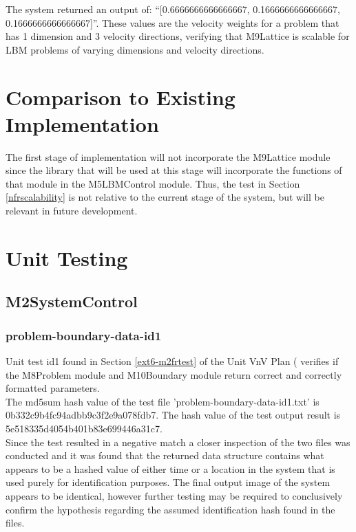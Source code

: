\documentclass[12pt, titlepage]{article}
\begin{document}
\noindent The system returned an output of: ``[0.6666666666666667, 0.1666666666666667, 0.1666666666666667]''. These values are the velocity weights for a problem that has 1 dimension and 3 velocity directions, verifying that M9Lattice is scalable for LBM problems of varying dimensions and velocity directions. 

\section{Comparison to Existing Implementation}	

The first stage of implementation will not incorporate the M9Lattice module since the library that will be used at this stage will incorporate the functions of that module in the M5LBMControl module. Thus, the test in Section \ref{nfrscalability} is not relative to the current stage of the system, but will be relevant in future development.

\section{Unit Testing}
\label{unittesting}

\subsection{M2SystemControl}
\subsubsection{problem-boundary-data-id1}
\label{M2id1}

Unit test id1 found in Section \ref{ext6-m2frtest} of the Unit VnV Plan (\citet{LBM_UVNV_PM} verifies if the M8Problem module and M10Boundary module return correct and correctly formatted parameters.\\

\noindent The md5sum hash value of the test file 'problem-boundary-data-id1.txt' is  0b332c9b4fc94adbb9c3f2e9a078fdb7. The hash value of the test output result is 5e518335d4054b401b83e699446a31c7.\\ 

\noindent Since the test resulted in a negative match a closer inspection of the two files was conducted and it was found that the returned data structure contains what appears to be a hashed value of either time or a location in the system that is used purely for identification purposes. The final output image of the system appears to be identical, however further testing may be required to conclusively confirm the hypothesis regarding the assumed identification hash found in the files. 
\end{document}
